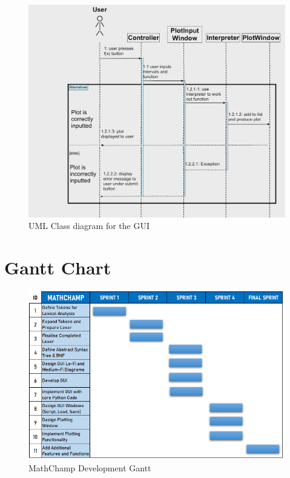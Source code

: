\documentclass[a4paper, oneside, 11pt]{report}
\begin{document}
\begin{figure}[H]
    \centering
    \includegraphics[width=15cm]{UMLSequence.png}
    \caption{UML Class diagram for the GUI}
    \label{fig:UMLSequence}
\end{figure}

\newpage

\section{Gantt Chart}\label{gantt}

\begin{figure}[H]
    \centering
    \includegraphics[width=15.5cm]{Gantt.png}
    \caption{MathChamp Development Gantt}
    \label{fig:Gantt}
\end{figure}
\end{document}
